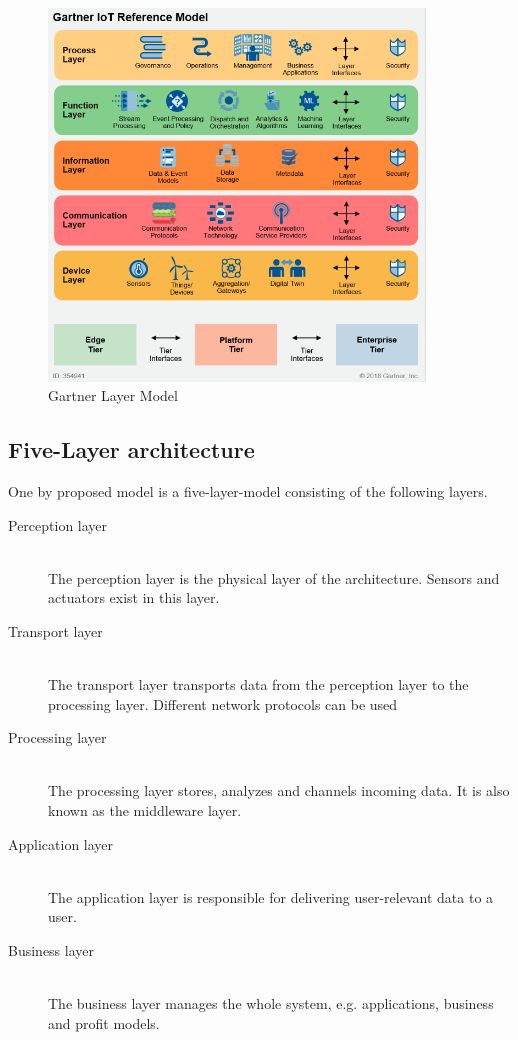 \begin{figure}[th]
	\centering
	\includegraphics[width=100mm,scale=1]{Figures/gartnerIoT}
	\decoRule
	\caption[Gartner]{Gartner Layer Model}
	\label{fig:gartnerIoT}
\end{figure}



\subsection{Five-Layer architecture}
One by \parencite{fiveLayer1,fiveLayer} proposed model is a five-layer-model consisting of the following layers.
\begin{description}
    \item [Perception layer] \hfill \\
    The perception layer is the physical layer of the architecture. Sensors and actuators exist in this layer.
    \item [Transport layer] \hfill \\
     The transport layer transports data from the perception layer to the processing layer. Different network protocols can be used
   \item [Processing layer] \hfill \\
   The processing layer stores, analyzes and channels incoming data. It is also known as the middleware layer.
   \item [Application layer] \hfill \\
   The application layer is responsible for delivering user-relevant data to a user.
   \item [Business layer] \hfill \\
   The business layer manages the whole system, e.g. applications, business and profit models.
\end{description}


